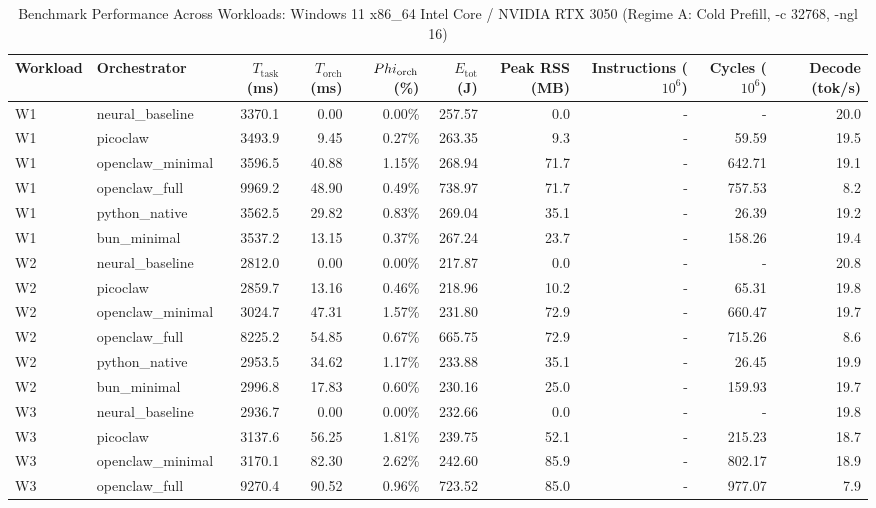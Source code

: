 \begin{table}[t]
\centering\small
\caption{Benchmark Performance Across Workloads: Windows 11 x86_64 Intel Core / NVIDIA RTX 3050 (Regime A: Cold Prefill, -c 32768, -ngl 16)}
\label{tab:Windows_master_summary}
\begin{tabular}{llrrrrrrrr}
\toprule
Workload & Orchestrator & $T_{\text{task}}$ (ms) & $T_{\text{orch}}$ (ms) & $\\Phi_{\text{orch}}$ (\%) & $E_{\text{tot}}$ (J) & Peak RSS (MB) & Instructions ($10^6$) & Cycles ($10^6$) & Decode (tok/s) \\
\midrule
W1 & neural\_baseline & 3370.1 & 0.00 & 0.00\% & 257.57 & 0.0 & - & - & 20.0 \\
W1 & picoclaw & 3493.9 & 9.45 & 0.27\% & 263.35 & 9.3 & - & 59.59 & 19.5 \\
W1 & openclaw\_minimal & 3596.5 & 40.88 & 1.15\% & 268.94 & 71.7 & - & 642.71 & 19.1 \\
W1 & openclaw\_full & 9969.2 & 48.90 & 0.49\% & 738.97 & 71.7 & - & 757.53 & 8.2 \\
W1 & python\_native & 3562.5 & 29.82 & 0.83\% & 269.04 & 35.1 & - & 26.39 & 19.2 \\
W1 & bun\_minimal & 3537.2 & 13.15 & 0.37\% & 267.24 & 23.7 & - & 158.26 & 19.4 \\
\midrule
W2 & neural\_baseline & 2812.0 & 0.00 & 0.00\% & 217.87 & 0.0 & - & - & 20.8 \\
W2 & picoclaw & 2859.7 & 13.16 & 0.46\% & 218.96 & 10.2 & - & 65.31 & 19.8 \\
W2 & openclaw\_minimal & 3024.7 & 47.31 & 1.57\% & 231.80 & 72.9 & - & 660.47 & 19.7 \\
W2 & openclaw\_full & 8225.2 & 54.85 & 0.67\% & 665.75 & 72.9 & - & 715.26 & 8.6 \\
W2 & python\_native & 2953.5 & 34.62 & 1.17\% & 233.88 & 35.1 & - & 26.45 & 19.9 \\
W2 & bun\_minimal & 2996.8 & 17.83 & 0.60\% & 230.16 & 25.0 & - & 159.93 & 19.7 \\
\midrule
W3 & neural\_baseline & 2936.7 & 0.00 & 0.00\% & 232.66 & 0.0 & - & - & 19.8 \\
W3 & picoclaw & 3137.6 & 56.25 & 1.81\% & 239.75 & 52.1 & - & 215.23 & 18.7 \\
W3 & openclaw\_minimal & 3170.1 & 82.30 & 2.62\% & 242.60 & 85.9 & - & 802.17 & 18.9 \\
W3 & openclaw\_full & 9270.4 & 90.52 & 0.96\% & 723.52 & 85.0 & - & 977.07 & 7.9 \\

\end{tabular}
\end{table}
